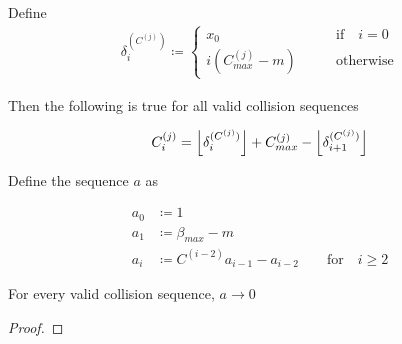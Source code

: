 \begin{theorem}
	Define 
	\begin{align}\label{delta_c}
			\delta^{(C^{(j)})}_i \coloneqq \begin{cases}
				x_0 \qquad &\text{if} \quad i = 0\\
				i (C^{(j)}_{max} - m) \qquad &\text{otherwise}
			\end{cases}
	\end{align}

	Then the following is true for all valid collision sequences

	\begin{align}\label{eq:c_i}
		C^{(j)}_i = \floor{\delta^{(C^{(j)})}_i} + C^{(j)}_{max} - \floor{\delta^{(C^{(j)})}_{i+1}}
	\end{align}
\end{theorem} 

\begin{theorem}
	Define the sequence $a$ as

	\begin{align}
		a_0& \coloneqq 1\\
		a_1& \coloneqq \beta_{max} - m\\
		a_i& \coloneqq C^{(i-2)} a_{i-1} - a_{i-2} \qquad \text{for} \quad i \ge 2
	\end{align}

	For every valid collision sequence, $a \to 0$
\end{theorem}

\begin{proof}

\end{proof}